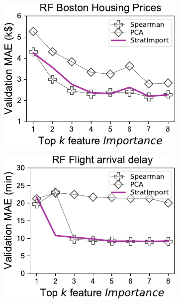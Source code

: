 \documentclass[11pt]{article}
\begin{document}
\begin{figure}
\centering
\begin{subfigure}{.245\textwidth}
    \centering
\includegraphics[scale=0.45]{images/boston-topk-RF-baseline.pdf}
\subcaption{}
\end{subfigure}%
\begin{subfigure}{.245\textwidth}
    \centering
\includegraphics[scale=0.45]{images/flights-topk-RF-baseline.pdf}
\subcaption{}
\end{subfigure}
\begin{subfigure}{.245\textwidth}
    \centering

\end{subfigure}
\end{figure}
\end{document}
